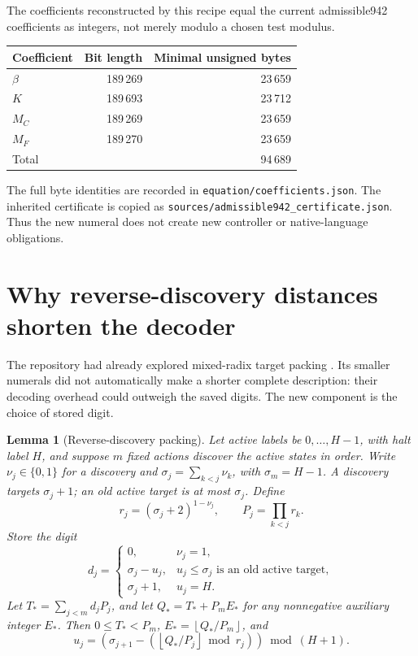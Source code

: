\documentclass[11pt,letterpaper]{article}
\newtheorem{lemma}[theorem]{Lemma}
\theoremstyle{definition}
\newcommand{\fl}[1]{\left\lfloor#1\right\rfloor}
\newcommand{\code}[1]{\texttt{\small #1}}
\begin{document}
The coefficients reconstructed by this recipe equal the current
admissible942 coefficients as integers, not merely modulo a chosen
test modulus.
\begin{center}
\begin{tabular}{lrr}
\toprule
Coefficient & Bit length & Minimal unsigned bytes\\
\midrule
\(\beta\)&189\,269&23\,659\\
\(K\)&189\,693&23\,712\\
\(M_C\)&189\,269&23\,659\\
\(M_F\)&189\,270&23\,659\\
\midrule
Total&&94\,689\\
\bottomrule
\end{tabular}
\end{center}
The full byte identities are recorded in
\code{equation/coefficients.json}. The inherited certificate is copied
as \code{sources/admissible942\_certificate.json}. Thus the new numeral
does not create new controller or native-language obligations.

\section{Why reverse-discovery distances shorten the decoder}
\label{sec:seedproof}

The repository had already explored mixed-radix target packing
\cite{mixed}. Its smaller numerals did not automatically make a shorter
complete description: their decoding overhead could outweigh the saved
digits. The new component is the choice of stored digit.

\begin{lemma}[Reverse-discovery packing]\label{lem:packing}
Let active labels be \(0,\ldots,H-1\), with halt label \(H\), and
suppose \(m\) fixed actions discover the active states in order.
Write \(\nu_j\in\{0,1\}\) for a discovery and
\(\sigma_j=\sum_{k<j}\nu_k\), with \(\sigma_m=H-1\).
A discovery targets \(\sigma_j+1\); an old active target is at most
\(\sigma_j\). Define
\[
 r_j=(\sigma_j+2)^{1-\nu_j},\qquad
 P_j=\prod_{k<j}r_k.
\]
Store the digit
\[
 d_j=
 \begin{cases}
 0,&\nu_j=1,\\
 \sigma_j-u_j,&u_j\le\sigma_j\text{ is an old active target},\\
 \sigma_j+1,&u_j=H.
 \end{cases}
\]
Let \(T_*=\sum_{j<m}d_jP_j\), and let
\(Q_*=T_*+P_m E_*\) for any nonnegative auxiliary integer \(E_*\).
Then \(0\le T_*<P_m\), \(E_*=\fl{Q_*/P_m}\), and
\[
 u_j=
 \left(\sigma_{j+1}
     -\left(\fl{Q_*/P_j}\bmod r_j\right)\right)\bmod(H+1).
\]
\end{lemma}
\end{document}
